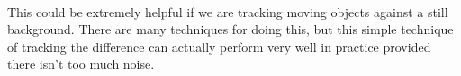 \documentclass[11pt]{article}
\begin{document}
    \begin{center}
    \end{center}
    { \hspace*{\fill} \\}
    
    This could be extremely helpful if we are tracking moving objects
against a still background. There are many techniques for doing this,
but this simple technique of tracking the difference can actually
perform very well in practice provided there isn't too much noise.


    
    
    
    
\end{document}
